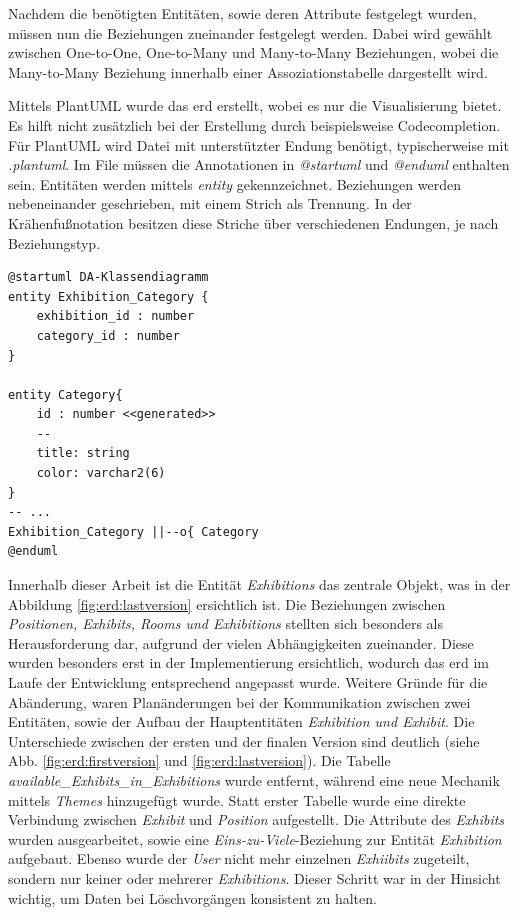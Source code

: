 Nachdem die benötigten Entitäten, sowie deren Attribute festgelegt wurden, müssen nun die Beziehungen zueinander festgelegt werden. 
Dabei wird gewählt zwischen One-to-One, One-to-Many und Many-to-Many Beziehungen, wobei die Many-to-Many Beziehung innerhalb einer Assoziationstabelle dargestellt wird. 

Mittels PlantUML wurde das \gls{erd} erstellt, wobei es nur die Visualisierung bietet. 
Es hilft nicht zusätzlich bei der Erstellung durch beispielsweise Codecompletion.
Für PlantUML wird Datei mit unterstützter Endung benötigt, typischerweise mit \emph{.plantuml}. 
Im File müssen die Annotationen in \emph{@startuml} und \emph{@enduml} enthalten sein.
Entitäten werden mittels \emph{entity} gekennzeichnet. 
Beziehungen werden nebeneinander geschrieben, mit einem Strich als Trennung. 
In der Krähenfußnotation besitzen diese Striche über verschiedenen Endungen, je nach Beziehungstyp. 

\begin{lstlisting}[label=lst:erdplantujml, caption=Ausschnitt der ERD-Datei]
@startuml DA-Klassendiagramm
entity Exhibition_Category {
    exhibition_id : number
    category_id : number
}

entity Category{
    id : number <<generated>>
    --
    title: string
    color: varchar2(6)
}
-- ...
Exhibition_Category ||--o{ Category
@enduml
\end{lstlisting}

Innerhalb dieser Arbeit ist die Entität \emph{Exhibitions} das zentrale Objekt, was in der Abbildung \ref{fig:erd:lastversion} ersichtlich ist.
Die Beziehungen zwischen \emph{Positionen, Exhibits, Rooms und Exhibitions} stellten sich besonders als Herausforderung dar, aufgrund der vielen Abhängigkeiten zueinander. 
Diese wurden besonders erst in der Implementierung ersichtlich, wodurch das \gls{erd} im Laufe der Entwicklung entsprechend angepasst wurde. 
Weitere Gründe für die Abänderung, waren Planänderungen bei der Kommunikation zwischen zwei Entitäten, sowie der Aufbau der Hauptentitäten \emph{Exhibition und Exhibit}. 
Die Unterschiede zwischen der ersten und der finalen Version sind deutlich (siehe Abb. \ref{fig:erd:firstversion} und \ref{fig:erd:lastversion}).
Die Tabelle \emph{available\_Exhibits\_in\_Exhibitions} wurde entfernt, während eine neue Mechanik mittels \emph{Themes} hinzugefügt wurde. 
Statt erster Tabelle wurde eine direkte Verbindung zwischen \emph{Exhibit} und \emph{Position} aufgestellt. 
Die Attribute des \emph{Exhibits} wurden ausgearbeitet, sowie eine \emph{Eins-zu-Viele}-Beziehung zur Entität \emph{Exhibition} aufgebaut. 
Ebenso wurde der \emph{User} nicht mehr einzelnen \emph{Exhiibits} zugeteilt, sondern nur keiner oder mehrerer \emph{Exhibitions}. 
Dieser Schritt war in der Hinsicht wichtig, um Daten bei Löschvorgängen konsistent zu halten. 


